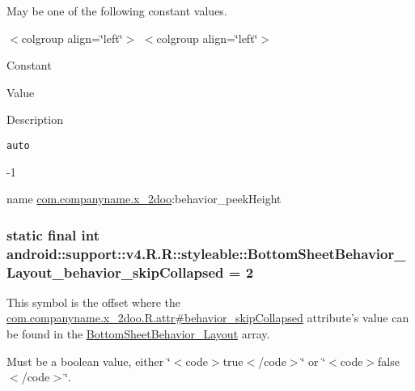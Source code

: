 May be one of the following constant values. \begin{TabularC}{0}
\hline
\end{TabularC}
$<$colgroup align=\char`\"{}left\char`\"{}$>$ $<$colgroup align=\char`\"{}left\char`\"{}$>$ 

Constant

Value

Description 

{\tt auto}

-1

name \hyperlink{namespacecom_1_1companyname_1_1x__2doo}{com.companyname.x\_\-2doo}:behavior\_\-peekHeight \hypertarget{classandroid_1_1support_1_1v4_1_1_r_1_1styleable_5f8ab199874fa9fe7918ba54df0f40cc}{
\subsubsection[{BottomSheetBehavior\_\-Layout\_\-behavior\_\-skipCollapsed}]{\setlength{\rightskip}{0pt plus 5cm}static final int android::support::v4.R.R::styleable::BottomSheetBehavior\_\-Layout\_\-behavior\_\-skipCollapsed = 2}}
\label{classandroid_1_1support_1_1v4_1_1_r_1_1styleable_5f8ab199874fa9fe7918ba54df0f40cc}


This symbol is the offset where the \hyperlink{classcom_1_1companyname_1_1x__2doo_1_1_r_1_1attr_71d19c3cd89650a80b96c2bb2a1c51a7}{com.companyname.x\_\-2doo.R.attr\#behavior\_\-skipCollapsed} attribute's value can be found in the \hyperlink{classandroid_1_1support_1_1v4_1_1_r_1_1styleable_d67360f84d04f5db038977a30714370e}{BottomSheetBehavior\_\-Layout} array.

Must be a boolean value, either \char`\"{}$<$code$>$true$<$/code$>$\char`\"{} or \char`\"{}$<$code$>$false$<$/code$>$\char`\"{}. 

